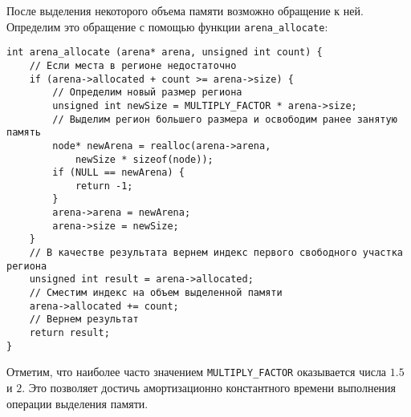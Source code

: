 После выделения некоторого объема памяти возможно обращение к ней. Определим это
обращение с помощью функции \verb|arena_allocate|:

\begin{verbatim}
int arena_allocate (arena* arena, unsigned int count) { 
    // Если места в регионе недостаточно 
    if (arena->allocated + count >= arena->size) { 
        // Определим новый размер региона 
        unsigned int newSize = MULTIPLY_FACTOR * arena->size;
        // Выделим регион большего размера и освободим ранее занятую память 
        node* newArena = realloc(arena->arena, 
            newSize * sizeof(node)); 
        if (NULL == newArena) { 
            return -1; 
        } 
        arena->arena = newArena; 
        arena->size = newSize; 
    }
    // В качестве результата вернем индекс первого свободного участка региона
    unsigned int result = arena->allocated; 
    // Сместим индекс на объем выделенной памяти 
    arena->allocated += count; 
    // Вернем результат 
    return result; 
}
\end{verbatim}

Отметим, что наиболее часто значением \verb|MULTIPLY_FACTOR| оказывается числа
$1.5$ и $2$. Это позволяет достичь амортизационно константного времени
выполнения операции выделения памяти\cite{FacebookDoc}.